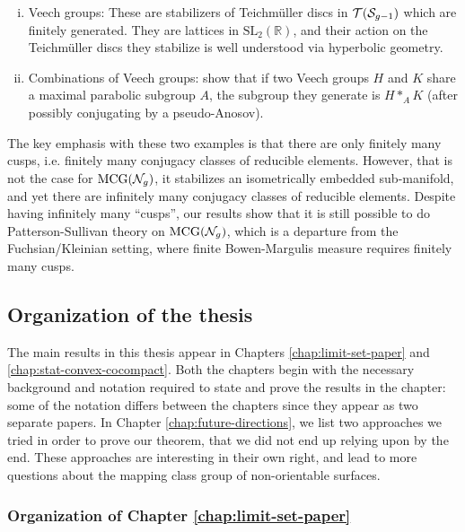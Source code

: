 \begin{enumerate}[(i)]
\item Veech groups: These are stabilizers of Teichmüller discs in $\mathcal{T}(\mathcal{S}_{g-1})$ which are finitely generated.
  They are lattices in $\mathrm{SL}_2(\mathbb{R})$, and their action on the Teichmüller discs they stabilize is well understood via hyperbolic geometry.
\item Combinations of Veech groups: \textcite{leininger2006combination} show that if two Veech groups $H$ and $K$ share a maximal parabolic subgroup $A$, the subgroup they generate is $H \ast_A K$ (after possibly conjugating by a pseudo-Anosov).
\end{enumerate}

The key emphasis with these two examples is that there are only finitely many cusps, i.e. finitely many conjugacy classes of reducible elements.
However, that is not the case for $\mathrm{MCG}(\mathcal{N}_g)$, it stabilizes an isometrically embedded sub-manifold, and yet there are infinitely many conjugacy classes of reducible elements.
Despite having infinitely many ``cusps'', our results show that it is still possible to do Patterson-Sullivan theory on $\mathrm{MCG}(\mathcal{N}_g)$, which is a departure from the Fuchsian/Kleinian setting, where finite Bowen-Margulis measure requires finitely many cusps.


\subsection*{Organization of the thesis}

The main results in this thesis appear in Chapters \ref{chap:limit-set-paper} and \ref{chap:stat-convex-cocompact}.
Both the chapters begin with the necessary background and notation required to state and prove the results in the chapter: some of the notation differs between the chapters since they appear as two separate papers.
In Chapter \ref{chap:future-directions}, we list two approaches we tried in order to prove our theorem, that we did not end up relying upon by the end.
These approaches are interesting in their own right, and lead to more questions about the mapping class group of non-orientable surfaces.

\subsubsection*{Organization of Chapter \ref{chap:limit-set-paper}}

